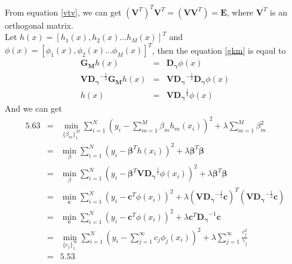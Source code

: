 \documentclass[11pt, oneside]{article}   	%
\begin{document}
From equation \ref{vtv}, we can get $(\mathbf{V}^T)^T \mathbf{V}^T = (\mathbf{V} \mathbf{V}^T) = \mathbf{E}$, where $\mathbf{V}^T$ is an orthogonal matrix.\\
Let $h(x) = [h_1(x), h_2(x) ... h_M(x) ]^T$ and $\phi(x) = [\phi_1(x), \phi_2(x) ... \phi_M(x) ]^T$, then the equation \ref{gkm} is eqaul to 
\begin{eqnarray}
\mathbf{G_M}h(x) &=& \mathbf{D_{\gamma}} \phi(x)\\
\mathbf{V} \mathbf{D_{\gamma}}^{-\frac{1}{2}} \mathbf{G_M}h(x) &=& \mathbf{V} \mathbf{D_{\gamma}}^{-\frac{1}{2}} \mathbf{D_{\gamma}} \phi(x) \\
h(x) &=& \mathbf{V} \mathbf{D_{\gamma}}^{\frac{1}{2}} \phi(x)
\end{eqnarray}
And we can get
\begin{eqnarray}
5.63 &=& \min_{\{\beta_m\}_1^M} \sum_{i=1}^N (y_i - \sum_{m=1}^M \beta_m h_m(x_i))^2 + \lambda \sum_{m=1}^M \beta_m^2 \\
&=& \min_\beta \sum_{i=1}^N (y_i - \mathbf{\beta}^T h(x_i))^2 + \lambda \mathbf{\beta}^T\mathbf{\beta} \label{der} \\
&=& \min_\beta \sum_{i=1}^N (y_i - \mathbf{\beta}^T \mathbf{V} \mathbf{D_{\gamma}}^{\frac{1}{2}} \phi(x_i))^2 + \lambda \mathbf{\beta}
^T\mathbf{\beta} \\
&=& \min_{\mathbf{c}} \sum_{i=1}^N (y_i - \mathbf{c}^T \phi(x_i))^2 + \lambda (\mathbf{V} \mathbf{D_{\gamma}}^{-\frac{1}{2} } \mathbf{c})^T (\mathbf{V} \mathbf{D_{\gamma}}^{-\frac{1}{2} } \mathbf{c}) \\
&=& \min_{\mathbf{c}} \sum_{i=1}^N (y_i - \mathbf{c}^T \phi(x_i))^2 + \lambda \mathbf{c}^T \mathbf{D_{\gamma}}^{-1} \mathbf{c}\\
&=& \min_{\{c_j\}_1^{\infty} }\sum_{i=1}^N (y_i - \sum_{j=1}^{\infty} {c_j \phi_j(x_i)})^2 + \lambda \sum_{j=1}^{\infty} \frac{c_j^2}{\gamma_j}\\
&=& 5.53
\end{eqnarray}
\end{document}
